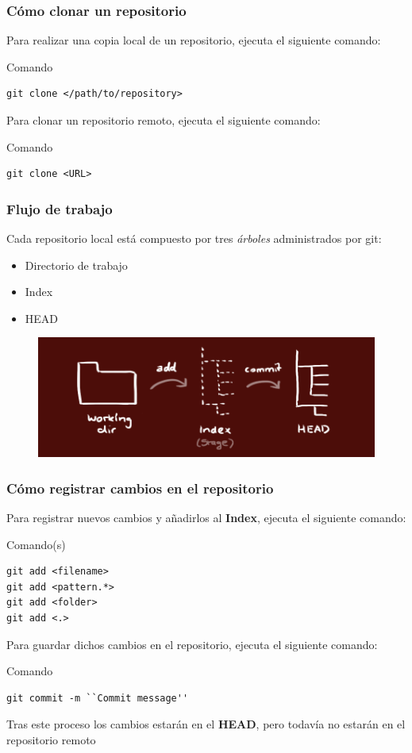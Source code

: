 \documentclass{beamer}
\begin{document}
\begin{frame}[fragile]
\frametitle{Cómo clonar un repositorio}
Para realizar una copia local de un repositorio, ejecuta el siguiente comando:
\begin{block}{Comando}
\begin{verbatim}
git clone </path/to/repository>
\end{verbatim}
\end{block}
\vskip 1.0cm
Para clonar un repositorio remoto, ejecuta el siguiente comando:
\begin{block}{Comando}
\begin{verbatim}
git clone <URL>
\end{verbatim}
\end{block}
\end{frame}

\begin{frame}
\frametitle{Flujo de trabajo}
Cada repositorio local está compuesto por tres \textit{árboles} administrados por git:
\begin{itemize}
\item Directorio de trabajo
\item Index
\item HEAD
\end{itemize}

\begin{figure}
\includegraphics[width=0.8\linewidth]{img/trees.png}
\end{figure}
\end{frame}

\begin{frame}[fragile]
\frametitle{Cómo registrar cambios en el repositorio}
Para registrar nuevos cambios y añadirlos al \textbf{Index}, ejecuta el siguiente comando:
\begin{block}{Comando(s)}
\begin{verbatim}
git add <filename>
git add <pattern.*>
git add <folder>
git add <.>
\end{verbatim}
\end{block}
\vskip 0.25cm
Para guardar dichos cambios en el repositorio, ejecuta el siguiente comando:
\begin{block}{Comando}
\begin{verbatim}
git commit -m ``Commit message''
\end{verbatim}
\end{block}
\vskip 0.25cm
Tras este proceso los cambios estarán en el \textbf{HEAD}, pero todavía no estarán en el repositorio remoto
\end{frame}
\end{document}
